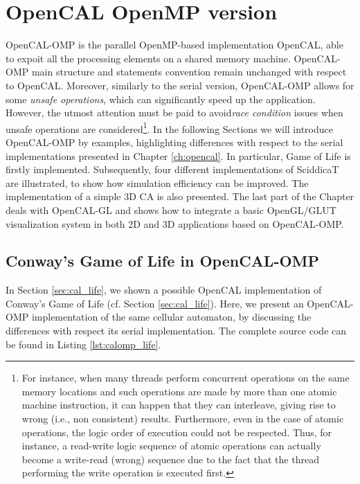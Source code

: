 \chapter{OpenCAL OpenMP version}\label{ch:opencal-omp}

OpenCAL-OMP is the parallel OpenMP-based implementation OpenCAL, able
to expoit all the processing elements on a shared memory
machine. OpenCAL-OMP main structure and statements convention remain
unchanged with respect to OpenCAL. Moreover, similarly to the serial
version, OpenCAL-OMP allows for some \emph{unsafe operations}, which
can significantly speed up the application. However, the utmost
attention must be paid to avoid\textsl{race condition} issues when
unsafe operations are considered\footnote{For instance, when many
  threads perform concurrent operations on the same memory locations
  and such operations are made by more than one atomic machine
  instruction, it can happen that they can interleave, giving rise to
  wrong (i.e., non consistent) results. Furthermore, even in the case
  of atomic operations, the logic order of execution could not be
  respected. Thus, for instance, a read-write logic sequence of atomic
  operations can actually become a write-read (wrong) sequence due to
  the fact that the thread performing the write operation is executed
  first.}. In the following Sections we will introduce OpenCAL-OMP by
examples, highlighting differences with respect to the serial
implementations presented in Chapter \ref{ch:opencal}. In particular,
Game of Life is firstly implemented. Subsequently, four different
implementations of SciddicaT are illustrated, to show how simulation
efficiency can be improved. The implementation of a simple 3D CA is
also presented. The last part of the Chapter deals with OpenCAL-GL and
shows how to integrate a basic OpenGL/GLUT visualization system in
both 2D and 3D applications based on OpenCAL-OMP.


\section{Conway's Game of Life in OpenCAL-OMP}

In Section \ref{sec:cal_life}, we shown a possible OpenCAL
implementation of Conway's Game of Life (cf. Section
\ref{sec:cal_life}). Here, we present an OpenCAL-OMP implementation of
the same cellular automaton, by discussing the differences with
respect its serial implementation. The complete source code can be
found in Listing \ref{lst:calomp_life}.

